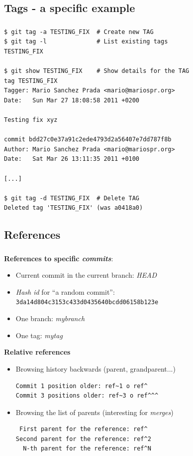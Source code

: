 \subsection{Tags - a specific example}
\begin{frame}[fragile]
  \frametitle{\insertsubsection}

  \begin{small}
\begin{verbatim}
$ git tag -a TESTING_FIX  # Create new TAG
$ git tag -l              # List existing tags
TESTING_FIX

$ git show TESTING_FIX    # Show details for the TAG
tag TESTING_FIX
Tagger: Mario Sanchez Prada <mario@mariospr.org>
Date:   Sun Mar 27 18:08:58 2011 +0200

Testing fix xyz

commit bdd27c0e37a91c2ede4793d2a56407e7dd787f8b
Author: Mario Sanchez Prada <mario@mariospr.org>
Date:   Sat Mar 26 13:11:35 2011 +0100

[...]

$ git tag -d TESTING_FIX  # Delete TAG
Deleted tag 'TESTING_FIX' (was a0418a0)
\end{verbatim}
  \end{small}

\end{frame}

\subsection{References}
\begin{frame}[fragile]
  \frametitle{\insertsubsection}

  \textbf{References to specific \textit{commits}}:
  \begin{itemize}
  \item Current commit in the current branch: \textit{HEAD}
  \item \textit{Hash id} for ``a random commit'': \texttt{3da14d804c3153c433d0435640bcdd06158b123e}
  \item One branch: \textit{mybranch}
  \item One tag: \textit{mytag}
  \end{itemize}\vspacing

  \textbf{Relative references}
  \begin{itemize}
  \item Browsing history backwards (parent, grandparent...)
\begin{verbatim}
Commit 1 position older: ref~1 o ref^
Commit 3 positions older: ref~3 o ref^^^
\end{verbatim}

  \item Browsing the list of parents (interesting for \textit{merges})
\begin{verbatim}
 First parent for the reference: ref^
Second parent for the reference: ref^2
  N-th parent for the reference: ref^N
\end{verbatim}
  \end{itemize}

\end{frame}

